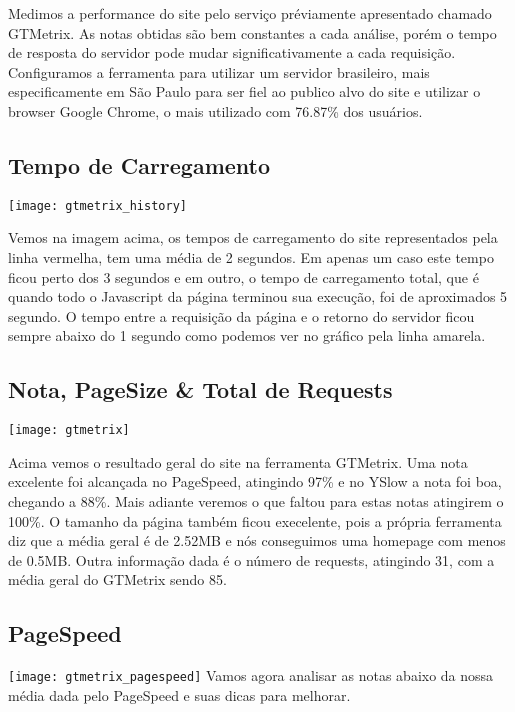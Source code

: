 \documentclass[
	12pt,				%
    oneside,			%
	a4paper,			%
	english,			%
	french,				%
	spanish,			%
	brazil				%
	]{abntex2}
\begin{document}
Medimos a performance do site pelo serviço préviamente apresentado chamado GTMetrix. As notas obtidas são bem constantes a cada análise, porém o tempo de resposta do servidor pode mudar significativamente a cada requisição. Configuramos a ferramenta para utilizar um servidor brasileiro, mais especificamente em São Paulo para ser fiel ao publico alvo do site e utilizar o browser Google Chrome, o mais utilizado com 76.87\%\cite{Chrome} dos usuários.

\subsection{Tempo de Carregamento}
\texttt{[image: gtmetrix\_history]}

Vemos na imagem acima, os tempos de carregamento do site representados pela linha vermelha, tem uma média de 2 segundos. Em apenas um caso este tempo ficou perto dos 3 segundos e em outro, o tempo de carregamento total, que é quando todo o Javascript da página terminou sua execução, foi de aproximados 5 segundo. O tempo entre a requisição da página e o retorno do servidor ficou sempre abaixo do 1 segundo como podemos ver no gráfico pela linha amarela.

\subsection{Nota, PageSize & Total de Requests}
\texttt{[image: gtmetrix]}

Acima vemos o resultado geral do site na ferramenta GTMetrix. Uma nota excelente foi alcançada no PageSpeed, atingindo 97\% e no YSlow a nota foi boa, chegando a 88\%. Mais adiante veremos o que faltou para estas notas atingirem o 100\%. O tamanho da página também ficou execelente, pois a própria ferramenta diz que a média geral é de 2.52MB e nós conseguimos uma homepage com menos de 0.5MB. Outra informação dada é o número de requests, atingindo 31, com a média geral do GTMetrix sendo 85.

\subsection{PageSpeed}
\texttt{[image: gtmetrix\_pagespeed]}
Vamos agora analisar as notas abaixo da nossa média dada pelo PageSpeed e suas dicas para melhorar.
\end{document}
